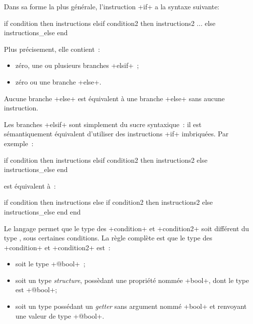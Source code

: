 Dans sa forme la plus générale, l'instruction \ggs+if+ a la syntaxe suivante:

\begin{galgasbox}
if condition then
  instructions
elsif condition2 then
  instructions2
...
else
  instructions_else
end
\end{galgasbox}


Plus précisement, elle contient~:
\begin{itemize}
\item zéro, une ou plusieurs branches \ggs+elsif+~;
\item zéro ou une branche \ggs+else+.
\end{itemize}


Aucune branche \ggs+else+ est équivalent à une branche \ggs+else+ sans aucune instruction.


Les branches \ggs+elsif+ sont simplement du sucre syntaxique~: il est sémantiquement équivalent d'utiliser des instructions \ggs+if+ imbriquées. Par exemple~:
\begin{galgas}
if condition then
  instructions
elsif condition2 then
  instructions2
else
  instructions_else
end
\end{galgas}

est équivalent à~:
\begin{galgas}
if condition then
  instructions
else
  if condition2 then
    instructions2
  else
    instructions_else
  end
end
\end{galgas}



Le langage permet que le type des \ggs+condition+ et \ggs+condition2+ soit différent du type , sous certaines conditions. La règle complète est que le type des \ggs+condition+ et \ggs+condition2+ est~:
\begin{itemize}
\item soit le type \ggs+@bool+~;
\item soit un type \emph{structure}, possèdant une propriété nommée \ggs+bool+, dont le type est \ggs+@bool+; 
\item soit un type possédant un \emph{getter} sans argument nommé \ggs+bool+ et renvoyant une valeur de type \ggs+@bool+.
\end{itemize}

